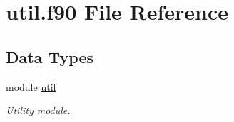 \hypertarget{util_8f90}{\section{util.\-f90 File Reference}
\label{util_8f90}
}
\subsection*{Data Types}
\begin{DoxyCompactItemize}
\item 
module \hyperlink{classutil}{util}
\begin{DoxyCompactList}\small\item\em Utility module. \end{DoxyCompactList}\end{DoxyCompactItemize}
